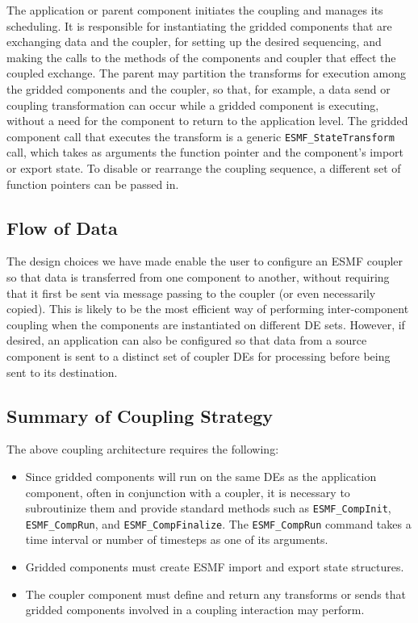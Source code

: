 The application or parent component initiates the coupling and manages 
its scheduling.  It is responsible for instantiating the gridded components
that are exchanging data and the coupler, for setting up the desired 
sequencing, and making the calls to the methods of the components and 
coupler that effect the coupled exchange.  The parent may partition the 
transforms
for execution among the gridded components and the coupler, so that, for 
example, a data send or coupling transformation can occur while a gridded 
component is executing, without a need for the component to return to the
application level.  The gridded component call that executes the transform
is a generic {\tt ESMF\_StateTransform} call, which takes as arguments the
function pointer and the component's import or export state.  To
disable or rearrange the coupling sequence, a different set of function
pointers can be passed in.  

\subsection{Flow of Data}

The design choices we have made enable the user to configure an ESMF
coupler so that data is transferred from one component to another, 
without requiring that it first be sent via message passing to the
coupler (or even necessarily
copied).  This is likely to be the most efficient way of performing 
inter-component coupling when the components are instantiated on different
DE sets.  However, if desired, an application can also be configured so that
data from a source component is sent to a distinct set of coupler 
DEs for processing before being sent to its destination.

\subsection{Summary of Coupling Strategy}

The above coupling architecture requires the following:
\begin{itemize}
\item Since gridded components will run on the same 
DEs as the application component, often in conjunction with a coupler, 
it is necessary to subroutinize
them and provide standard methods such as {\tt ESMF\_CompInit}, 
{\tt ESMF\_CompRun}, and {\tt ESMF\_CompFinalize}.  The {\tt ESMF\_CompRun}
command takes a time interval or number of timesteps as one of its 
arguments.
\item Gridded components must create ESMF import and export state 
structures.
\item The coupler component must define and return any transforms or 
sends that gridded components involved in a coupling interaction may 
perform.
\end{itemize}

